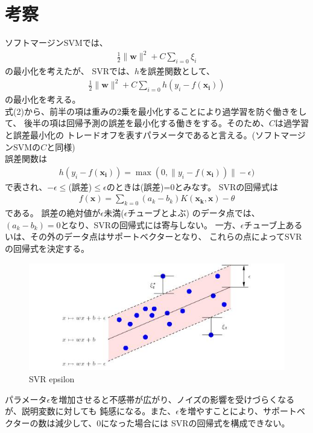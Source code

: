 \documentclass{jsarticle}
\begin{document}
\section{考察}
ソフトマージンSVMでは、
\begin{eqnarray}
\frac{1}{2}\|\bm{w}\|^2 + C \sum_{i=0} \xi_i
\end{eqnarray}
の最小化を考えたが、
SVRでは、$h$を誤差関数として、
\begin{eqnarray}
\frac{1}{2}\|\bm{w}\|^2 + C \sum_{i=0} h(y_i - f(\bm{x_i}))
\end{eqnarray}
の最小化を考える。\\
式(2)から、前半の項は重みの2乗を最小化することにより過学習を防ぐ働きをして、
後半の項は回帰予測の誤差を最小化する働きをする。そのため、$C$は過学習と誤差最小化の
トレードオフを表すパラメータであると言える。(ソフトマージンSVMの$C$と同様) \\
誤差関数は
\begin{eqnarray}
h(y_i - f(\bm{x_i})) = \max(0, \|y_i - f(\bm{x_i}))\| - \epsilon)
\end{eqnarray}
で表され、$-\epsilon \leq $(誤差)$ \leq \epsilon$のときは(誤差)=0とみなす。
SVRの回帰式は
\begin{eqnarray*}
f(\bm{x}) = \sum_{k=0} (a_k - b_k) K(\bm{x_k}, \bm{x}) - \theta
\end{eqnarray*}
である。
誤差の絶対値が$\epsilon$未満($\epsilon$チューブとよぶ)
のデータ点では、$(a_k - b_k) = 0$となり、SVRの回帰式には寄与しない。
一方、$\epsilon$チューブ上あるいは、その外のデータ点はサポートベクターとなり、
これらの点によってSVRの回帰式を決定する。

\begin{figure}[!h]
\includegraphics[width=15cm]{eps_svr.jpg}
\caption{SVR epsilon}
\end{figure}
パラメータ$\epsilon$を増加させると不感帯が広がり、ノイズの影響を受けづらくなるが、説明変数に対しても
鈍感になる。また、$\epsilon$を増やすことにより、サポートベクターの数は減少して、0になった場合には
SVRの回帰式を構成できない。
\end{document}
